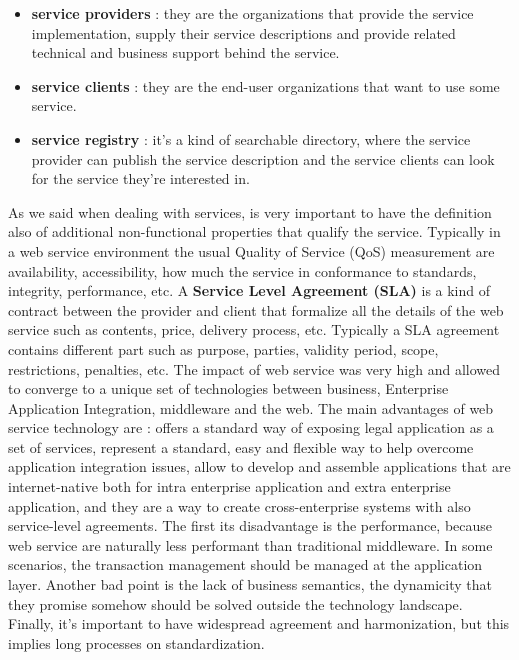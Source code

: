 \documentclass[11pt]{article}
\begin{document}
\begin{itemize}
\item \textbf{service providers} : they are the organizations that provide the service implementation, supply their service descriptions and provide related technical and business support behind the service.
\item \textbf{service clients} : they are the end-user organizations that want to use some service.
\item \textbf{service registry} : it's a kind of searchable directory, where the service provider can publish the service description and the service clients can look for the service they're interested in.
\end{itemize}
As we said when dealing with services, is very important to have the definition also of additional non-functional properties that qualify the service. Typically in a web service environment the usual Quality of Service (QoS) measurement are availability, accessibility, how much the service in conformance to standards, integrity, performance, etc. A \textbf{Service Level Agreement (SLA)} is a kind of contract between the provider and client that formalize all the details of the web service such as contents, price, delivery process, etc. Typically a SLA agreement contains different part such as purpose, parties, validity period, scope, restrictions, penalties, etc. The impact of web service was very high and allowed to converge to a unique set of technologies between business, Enterprise Application Integration, middleware and the web. The main advantages of web service technology are : offers a standard way of exposing legal application as a set of services, represent a standard, easy and flexible way to help overcome application integration issues, allow to develop and assemble applications that are internet-native both for intra enterprise application and extra enterprise application, and they are a way to create cross-enterprise systems with also service-level agreements. The first its disadvantage is the performance, because web service are naturally less performant than traditional middleware. In some scenarios, the transaction management should be managed at the application layer. Another bad point is the lack of business semantics, the dynamicity that they promise somehow should be solved outside the technology landscape. Finally, it's important to have widespread agreement and harmonization, but this implies long processes on standardization.
\end{document}
